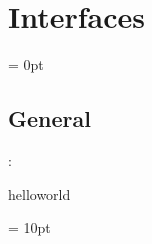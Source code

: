 
\section{Interfaces} 


\parskip = 0pt

\vspace{3mm} \subsection*{General}

: 

helloworld
\vspace{2mm}

\vspace{5mm}\parskip = 10pt 
